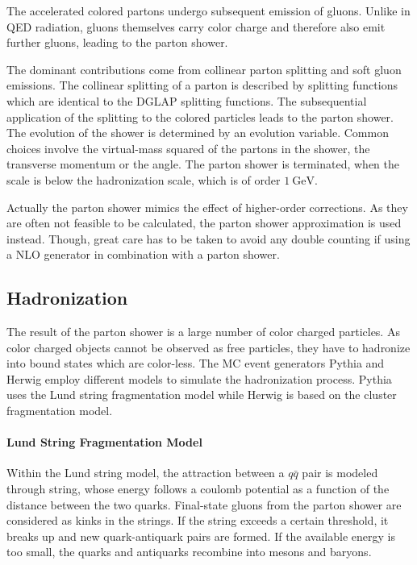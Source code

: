 The accelerated colored partons undergo subsequent emission of gluons. Unlike in
QED radiation, gluons themselves carry color charge and therefore also emit
further gluons, leading to the parton shower. 

The dominant contributions come from collinear parton splitting and soft gluon
emissions. The collinear splitting of a parton is described by splitting
functions which are identical to the DGLAP splitting functions. The
subsequential application of the splitting to the colored particles leads to the
parton shower. The evolution of the shower is determined by an evolution
variable. Common choices involve the virtual-mass squared of the partons in the
shower, the transverse momentum or the angle. The parton shower is terminated,
when the scale is below the hadronization scale, which is of order $\SI{1}{\GeV}$.

Actually the parton shower mimics the effect of higher-order corrections. As
they are often not feasible to be calculated, the parton shower approximation is
used instead. Though, great care has to be taken to avoid any double counting if
using a NLO generator in combination with a parton shower.

\subsection{Hadronization}

The result of the parton shower is a large number of color charged particles. As
color charged objects cannot be observed as free particles, they have to
hadronize into bound states which are color-less. The MC event generators Pythia
and Herwig employ different models to simulate the hadronization process. Pythia
uses the Lund string fragmentation model while Herwig is based on the cluster
fragmentation model.

\paragraph{Lund String Fragmentation Model}

Within the Lund string model, the attraction between a $q\bar q$ pair is
modeled through string, whose energy follows a coulomb potential as a function
of the distance between the two quarks. Final-state gluons from the parton
shower are considered as kinks in the strings. If the string exceeds a certain
threshold, it breaks up and new quark-antiquark pairs are formed. If the
available energy is too small, the quarks and antiquarks recombine into mesons
and baryons.

